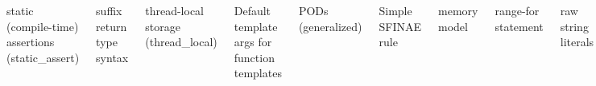 \begin{frame}[fragile]
\begin{columns}[t]
{static (compile-time) assertions (static\_assert)

suffix return type syntax

thread-local storage (thread\_local)

Default template args for function templates

}

{\scriptsize
PODs (generalized)

Simple SFINAE rule

memory model

range-for statement

raw string literals

right-angle brackets

template alias

unicode characters

unions (generalized)

user-defined literals

variadic templates 

\vskip 12pt

smart pointers

}
\end{columns}

\end{frame}

\setlength\fboxsep{0pt}
\newcommand{\hlt}[1]{\colorbox{TerumoGreen}{{#1}}}

